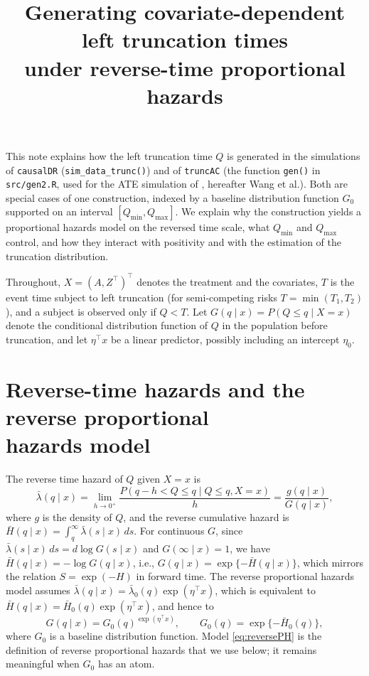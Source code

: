 \documentclass[11pt]{article}
\title{Generating covariate-dependent left truncation times\\
under reverse-time proportional hazards}
\date{}
\newcommand{\Qmin}{Q_{\min}}
\newcommand{\Qmax}{Q_{\max}}
\begin{document}
\maketitle

This note explains how the left truncation time $Q$ is generated in the simulations of
\texttt{causalDR} (\texttt{sim\_data\_trunc()}) and of \texttt{truncAC} (the function
\texttt{gen()} in \texttt{src/gen2.R}, used for the ATE simulation of
\citealt{wang2025liberatingframeworktruncationcensoring}, hereafter Wang et al.). Both
are special cases of one construction, indexed by a baseline distribution function $G_0$
supported on an interval $[\Qmin, \Qmax]$. We explain why the construction yields a
proportional hazards model on the reversed time scale, what $\Qmin$ and $\Qmax$ control,
and how they interact with positivity and with the estimation of the truncation
distribution.

Throughout, $X = (A, Z^\top)^\top$ denotes the treatment and the covariates, $T$ is the
event time subject to left truncation (for semi-competing risks $T = \min(T_1, T_2)$), and
a subject is observed only if $Q < T$. Let $G(q \mid x) = P(Q \le q \mid X = x)$ denote the
conditional distribution function of $Q$ in the population before truncation, and let
$\eta^\top x$ be a linear predictor, possibly including an intercept $\eta_0$.

\section{Reverse-time hazards and the reverse proportional\texorpdfstring{\\}{} hazards model}

The reverse time hazard of $Q$ given $X = x$ is
\begin{equation*}
\bar\lambda(q \mid x) = \lim_{h \to 0^+}
\frac{P(q - h < Q \le q \mid Q \le q, X = x)}{h}
= \frac{g(q \mid x)}{G(q \mid x)},
\end{equation*}
where $g$ is the density of $Q$, and the reverse cumulative hazard is
$\bar H(q \mid x) = \int_q^\infty \bar\lambda(s \mid x)\,ds$. For continuous $G$, since
$\bar\lambda(s \mid x)\,ds = d\log G(s \mid x)$ and $G(\infty \mid x) = 1$, we have
$\bar H(q \mid x) = -\log G(q \mid x)$, i.e., $G(q \mid x) = \exp\{-\bar H(q \mid x)\}$,
which mirrors the relation $S = \exp(-H)$ in forward time. The reverse proportional
hazards model assumes $\bar\lambda(q \mid x) = \bar\lambda_0(q)\exp(\eta^\top x)$, which is
equivalent to $\bar H(q \mid x) = \bar H_0(q)\exp(\eta^\top x)$, and hence to
\begin{equation}\label{eq:reversePH}
G(q \mid x) = G_0(q)^{\exp(\eta^\top x)}, \qquad G_0(q) = \exp\{-\bar H_0(q)\},
\end{equation}
where $G_0$ is a baseline distribution function. Model \eqref{eq:reversePH} is the
definition of reverse proportional hazards that we use below; it remains meaningful when
$G_0$ has an atom.
\end{document}
